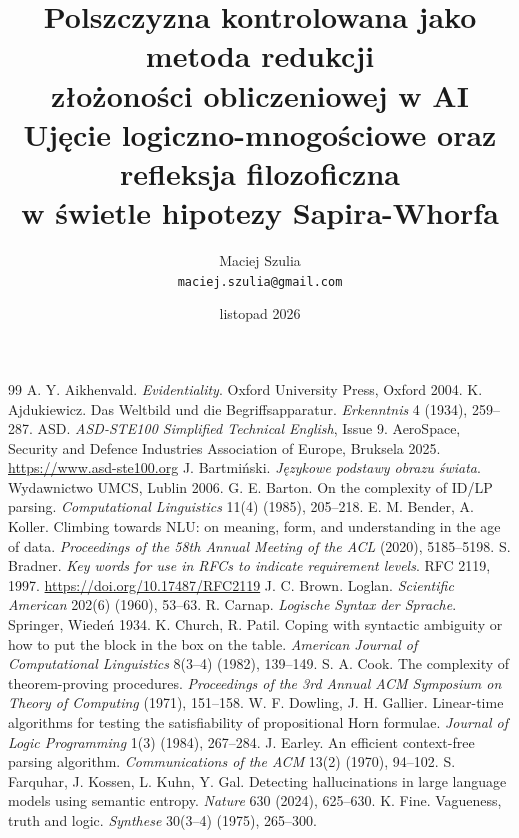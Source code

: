 \documentclass[11pt,a4paper]{article}
\title{\textbf{Polszczyzna kontrolowana jako metoda redukcji\\ złożoności obliczeniowej w AI}\\[4pt]
\large Ujęcie logiczno-mnogościowe oraz refleksja filozoficzna\\
w świetle hipotezy Sapira-Whorfa}
\author{Maciej Szulia\\[2pt]\normalsize\texttt{maciej.szulia@gmail.com}}
\date{listopad 2026}
\begin{document}
\maketitle










\begin{thebibliography}{99}
\small
{} A. Y. Aikhenvald. \emph{Evidentiality}. Oxford University Press, Oxford 2004.
 K. Ajdukiewicz. Das Weltbild und die Begriffsapparatur. \emph{Erkenntnis} 4 (1934), 259--287.
 ASD. \emph{ASD-STE100 Simplified Technical English}, Issue 9. AeroSpace, Security and Defence Industries Association of Europe, Bruksela 2025. \url{https://www.asd-ste100.org}
 J. Bartmiński. \emph{Językowe podstawy obrazu świata}. Wydawnictwo UMCS, Lublin 2006.
 G. E. Barton. On the complexity of ID/LP parsing. \emph{Computational Linguistics} 11(4) (1985), 205--218.
 E. M. Bender, A. Koller. Climbing towards NLU: on meaning, form, and understanding in the age of data. \emph{Proceedings of the 58th Annual Meeting of the ACL} (2020), 5185--5198.
 S. Bradner. \emph{Key words for use in RFCs to indicate requirement levels}. RFC 2119, 1997. \url{https://doi.org/10.17487/RFC2119}
 J. C. Brown. Loglan. \emph{Scientific American} 202(6) (1960), 53--63.
 R. Carnap. \emph{Logische Syntax der Sprache}. Springer, Wiedeń 1934.
 K. Church, R. Patil. Coping with syntactic ambiguity or how to put the block in the box on the table. \emph{American Journal of Computational Linguistics} 8(3--4) (1982), 139--149.
 S. A. Cook. The complexity of theorem-proving procedures. \emph{Proceedings of the 3rd Annual ACM Symposium on Theory of Computing} (1971), 151--158.
 W. F. Dowling, J. H. Gallier. Linear-time algorithms for testing the satisfiability of propositional Horn formulae. \emph{Journal of Logic Programming} 1(3) (1984), 267--284.
 J. Earley. An efficient context-free parsing algorithm. \emph{Communications of the ACM} 13(2) (1970), 94--102.
 S. Farquhar, J. Kossen, L. Kuhn, Y. Gal. Detecting hallucinations in large language models using semantic entropy. \emph{Nature} 630 (2024), 625--630.
 K. Fine. Vagueness, truth and logic. \emph{Synthese} 30(3--4) (1975), 265--300.

\end{thebibliography}
\end{document}
